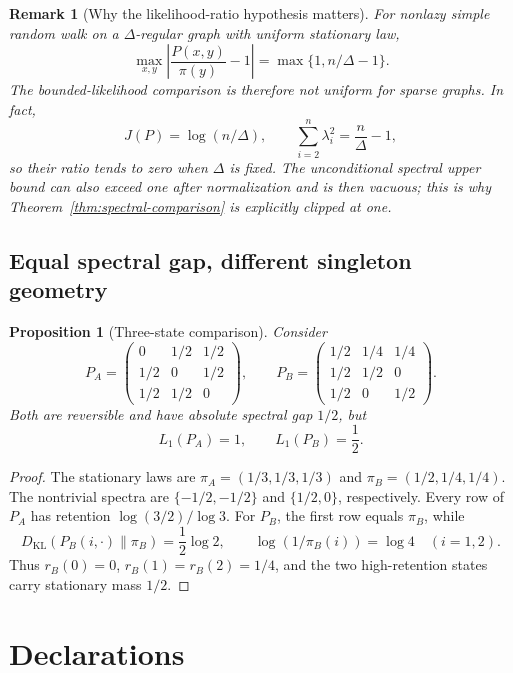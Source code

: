 \documentclass[11pt]{article}
\newtheorem{proposition}[theorem]{Proposition}
\newtheorem{remark}[theorem]{Remark}
\newcommand{\KL}{D_{\mathrm{KL}}}
\newcommand{\Lone}{L_1}
\begin{document}
\begin{remark}[Why the likelihood-ratio hypothesis matters]
For nonlazy simple random walk on a \(\Delta\)-regular graph with uniform
stationary law,
\[
  \max_{x,y}\left|\frac{P(x,y)}{\pi(y)}-1\right|
  =\max\{1,n/\Delta-1\}.
\]
The bounded-likelihood comparison is therefore not uniform for sparse
graphs.  In fact,
\[
  J(P)=\log(n/\Delta),
  \qquad
  \sum_{i=2}^n\lambda_i^2=\frac{n}{\Delta}-1,
\]
so their ratio tends to zero when \(\Delta\) is fixed.  The unconditional
spectral upper bound can also exceed one after normalization and is then
vacuous; this is why Theorem~\ref{thm:spectral-comparison} is explicitly
clipped at one.
\end{remark}

\subsection{Equal spectral gap, different singleton geometry}

\begin{proposition}[Three-state comparison]
\label{prop:same-gap}
Consider
\[
  P_A=
  \begin{pmatrix}
  0&1/2&1/2\\
  1/2&0&1/2\\
  1/2&1/2&0
  \end{pmatrix},
  \qquad
  P_B=
  \begin{pmatrix}
  1/2&1/4&1/4\\
  1/2&1/2&0\\
  1/2&0&1/2
  \end{pmatrix}.
\]
Both are reversible and have absolute spectral gap \(1/2\), but
\[
  \Lone(P_A)=1,\qquad \Lone(P_B)=\frac12.
\]
\end{proposition}

\begin{proof}
The stationary laws are
\(\pi_A=(1/3,1/3,1/3)\) and
\(\pi_B=(1/2,1/4,1/4)\).  The nontrivial spectra are
\(\{-1/2,-1/2\}\) and \(\{1/2,0\}\), respectively.  Every row of \(P_A\)
has retention \(\log(3/2)/\log3\).  For \(P_B\), the first row equals
\(\pi_B\), while
\[
  \KL(P_B(i,\cdot)\|\pi_B)=\frac12\log2,
  \qquad
  \log(1/\pi_B(i))=\log4
  \quad(i=1,2).
\]
Thus \(r_B(0)=0\), \(r_B(1)=r_B(2)=1/4\), and the two high-retention
states carry stationary mass \(1/2\).
\end{proof}

\section*{Declarations}
\end{document}
